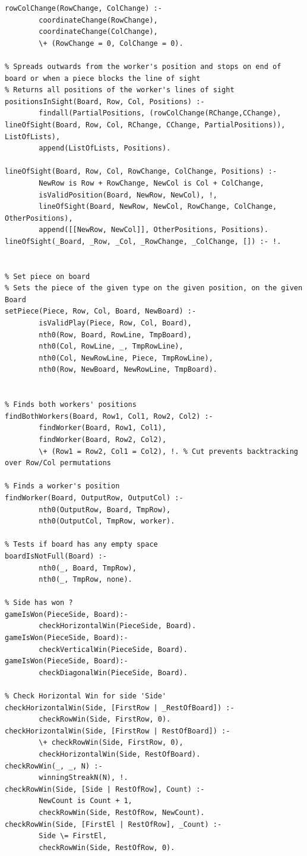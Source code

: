 \documentclass[a4paper]{article}
\begin{document}
\begin{lstlisting}
rowColChange(RowChange, ColChange) :-
        coordinateChange(RowChange),
        coordinateChange(ColChange),
        \+ (RowChange = 0, ColChange = 0).

% Spreads outwards from the worker's position and stops on end of board or when a piece blocks the line of sight
% Returns all positions of the worker's lines of sight
positionsInSight(Board, Row, Col, Positions) :-
        findall(PartialPositions, (rowColChange(RChange,CChange), lineOfSight(Board, Row, Col, RChange, CChange, PartialPositions)), ListOfLists),
        append(ListOfLists, Positions).

lineOfSight(Board, Row, Col, RowChange, ColChange, Positions) :-
        NewRow is Row + RowChange, NewCol is Col + ColChange,
        isValidPosition(Board, NewRow, NewCol), !,
        lineOfSight(Board, NewRow, NewCol, RowChange, ColChange, OtherPositions),
        append([[NewRow, NewCol]], OtherPositions, Positions).
lineOfSight(_Board, _Row, _Col, _RowChange, _ColChange, []) :- !.

                                                                   
% Set piece on board
% Sets the piece of the given type on the given position, on the given Board
setPiece(Piece, Row, Col, Board, NewBoard) :-
        isValidPlay(Piece, Row, Col, Board),
        nth0(Row, Board, RowLine, TmpBoard),
        nth0(Col, RowLine, _, TmpRowLine),
        nth0(Col, NewRowLine, Piece, TmpRowLine),
        nth0(Row, NewBoard, NewRowLine, TmpBoard).


% Finds both workers' positions
findBothWorkers(Board, Row1, Col1, Row2, Col2) :-
        findWorker(Board, Row1, Col1),
        findWorker(Board, Row2, Col2),
        \+ (Row1 = Row2, Col1 = Col2), !. % Cut prevents backtracking over Row/Col permutations 

% Finds a worker's position
findWorker(Board, OutputRow, OutputCol) :-
        nth0(OutputRow, Board, TmpRow),
        nth0(OutputCol, TmpRow, worker).

% Tests if board has any empty space
boardIsNotFull(Board) :-
        nth0(_, Board, TmpRow),
        nth0(_, TmpRow, none).

% Side has won ?
gameIsWon(PieceSide, Board):-
        checkHorizontalWin(PieceSide, Board).
gameIsWon(PieceSide, Board):-
        checkVerticalWin(PieceSide, Board).
gameIsWon(PieceSide, Board):-
        checkDiagonalWin(PieceSide, Board).

% Check Horizontal Win for side 'Side'
checkHorizontalWin(Side, [FirstRow | _RestOfBoard]) :-
        checkRowWin(Side, FirstRow, 0).
checkHorizontalWin(Side, [FirstRow | RestOfBoard]) :-
        \+ checkRowWin(Side, FirstRow, 0),
        checkHorizontalWin(Side, RestOfBoard).
checkRowWin(_, _, N) :-
        winningStreakN(N), !.
checkRowWin(Side, [Side | RestOfRow], Count) :-
        NewCount is Count + 1,
        checkRowWin(Side, RestOfRow, NewCount).
checkRowWin(Side, [FirstEl | RestOfRow], _Count) :-
        Side \= FirstEl,
        checkRowWin(Side, RestOfRow, 0).



\end{lstlisting}
\end{document}
